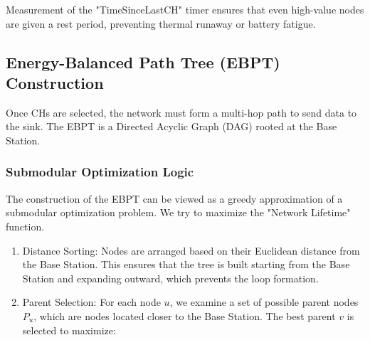 \documentclass[conference]{IEEEtran}
\begin{document}
\begin{figure}[htbp]
\centering
{}
\end{figure}

Measurement of the "TimeSinceLastCH" timer ensures that even high-value nodes are given a rest period, preventing thermal runaway or battery fatigue.

\subsection{Energy-Balanced Path Tree (EBPT) Construction}
Once CHs are selected, the network must form a multi-hop path to send data to the sink. The EBPT is a Directed Acyclic Graph (DAG) rooted at the Base Station.

\subsubsection{Submodular Optimization Logic}
The construction of the EBPT can be viewed as a greedy approximation of a submodular optimization problem. We try to maximize the "Network Lifetime" function.
\begin{enumerate}
    \item Distance Sorting: Nodes are arranged based on their Euclidean distance from the Base Station. This ensures that the tree is built starting from the Base Station and expanding outward, which prevents the loop formation.
    \item Parent Selection: For each node $u$, we examine a set of possible parent nodes $P_u$, which are nodes located closer to the Base Station. The best parent $v$ is selected to maximize:
\end{enumerate}
\end{document}

